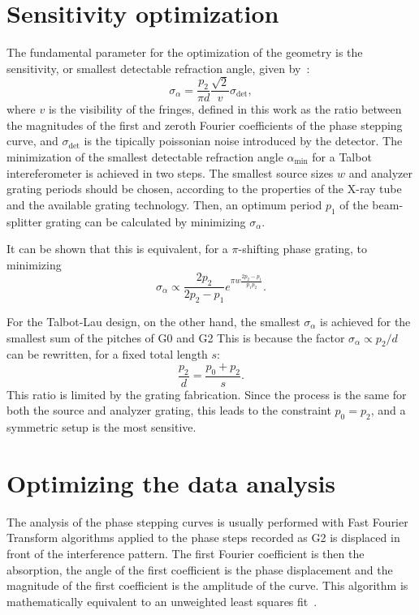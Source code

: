 \documentclass[a4paper]{spie}
\begin{document}
\section{Sensitivity optimization}
The fundamental parameter for the optimization of the geometry is the
sensitivity, or smallest detectable refraction angle, given
by~\cite{Raupach2011}:
\begin{equation*}
    \sigma_\alpha = \frac{p_2}{\pi d}
    \frac{\sqrt{2}}{v}\sigma_{\text{det}},
\end{equation*}
where $v$ is the visibility of the fringes, defined in this work as the
ratio between the magnitudes of the first and zeroth Fourier coefficients of
the phase stepping curve, and $\sigma_{\text{det}}$ is the
tipically poissonian noise introduced by the detector.
The minimization of the smallest detectable refraction angle 
$\alpha_\text{min}$\cite{Thuering2012} for a Talbot intereferometer is
achieved in two steps.
The smallest source sizes $w$ and analyzer grating periods should be chosen,
according to the properties of the X-ray tube and the available grating
technology. Then, an optimum period $p_{1}$ of the beam-splitter grating can be
calculated by minimizing $\sigma_\alpha$.

It can be shown that this is equivalent, for a $\pi$-shifting phase grating,
to minimizing~\cite{Thuering2014}
\begin{equation*}
    \sigma_\alpha \propto \frac{2p_2}{2p_2 - p_1}e^{\pi w
        \frac{2p_2 - p_1}{p_1 p_2}}.
\end{equation*}

For the Talbot-Lau design, on the other hand, the smallest $\sigma_\alpha$ is achieved for
the smallest sum of the pitches of G0 and G2
This is because the factor $\sigma_\alpha \propto p_2/d$ can be rewritten,
for a fixed total length $s$:
\begin{equation*}
    \frac{p_2}{d} = \frac{p_0 + p_2}{s}.
\end{equation*}                              
This ratio is limited by
the grating fabrication. Since the process is the same for both the source
and analyzer grating, this leads to the constraint $p_0 = p_2$, and a 
symmetric setup is the most sensitive.
                                             
\section{Optimizing the data analysis}
The analysis of the phase stepping curves is usually performed with Fast Fourier
Transform algorithms applied to the phase steps recorded as G2 is displaced
in front of the interference pattern.
The first Fourier coefficient is then the absorption, the angle of the first
coefficient is the phase displacement and the magnitude of the first
coefficient is the amplitude of the curve.
This algorithm is mathematically equivalent to an unweighted least squares fit~\cite{FFTEquivalence}.
\end{document}
